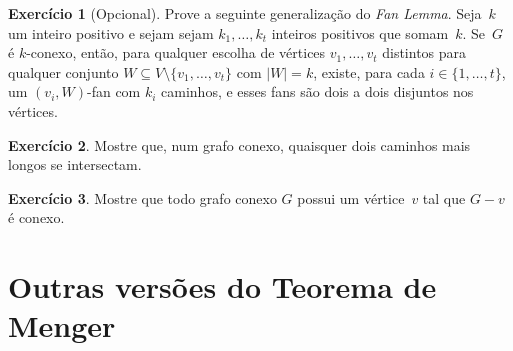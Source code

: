 \documentclass[12pt, a4paper]{article}
\theoremstyle{definition}
\newtheorem{exer}{Exercício}
\begin{document}
\begin{exer}[Opcional]
  Prove a seguinte generalização do \emph{Fan Lemma}. Seja~$k$ um
  inteiro positivo e sejam sejam $k_1,\dots,k_t$ inteiros positivos
  que somam~$k$. Se~$G$ é $k$-conexo, então, para qualquer escolha de
  vértices $v_1,\dots,v_t$ distintos para qualquer conjunto
  $W \subseteq V \setminus \{v_1,\dots,v_t\}$ com $|W| = k$, existe,
  para cada $i \in \{1, \dots, t\}$, um $(v_i,W)$-fan com $k_i$
  caminhos, e esses fans são dois a dois disjuntos nos vértices.
\end{exer}



\begin{exer}
  Mostre que, num grafo conexo, quaisquer dois caminhos mais longos se intersectam.
\end{exer}

\begin{exer}
  Mostre que todo grafo conexo $G$ possui um vértice~$v$ tal que $G-v$ é conexo.
\end{exer}

\section {Outras versões do Teorema de Menger}
\end{document}
